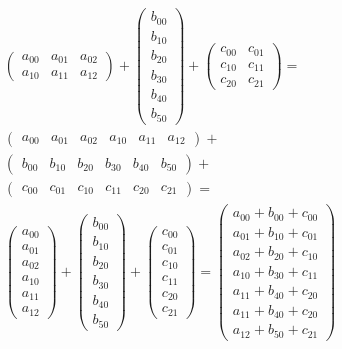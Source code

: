 \begin{multline}
    \begin{pmatrix} a_{00} & a_{01} & a_{02} \\ a_{10} & a_{11} & a_{12} \end{pmatrix} +
    \begin{pmatrix} b_{00} \\ b_{10} \\ b_{20} \\ b_{30} \\ b_{40} \\ b_{50} \end{pmatrix} +
    \begin{pmatrix} c_{00} & c_{01} \\ c_{10} & c_{11} \\ c_{20} & c_{21} \end{pmatrix} = \\
    \begin{pmatrix} a_{00} & a_{01} & a_{02} & a_{10} & a_{11} & a_{12} \end{pmatrix} + \\
    \begin{pmatrix} b_{00} & b_{10} & b_{20} & b_{30} & b_{40} & b_{50} \end{pmatrix} + \\
    \begin{pmatrix} c_{00} & c_{01} & c_{10} & c_{11} & c_{20} & c_{21} \end{pmatrix} = \\
    \begin{pmatrix} a_{00} \\ a_{01} \\ a_{02} \\ a_{10} \\ a_{11} \\ a_{12} \end{pmatrix} +
    \begin{pmatrix} b_{00} \\ b_{10} \\ b_{20} \\ b_{30} \\ b_{40} \\ b_{50} \end{pmatrix} +
    \begin{pmatrix} c_{00} \\ c_{01} \\ c_{10} \\ c_{11} \\ c_{20} \\ c_{21} \end{pmatrix} =
    \begin{pmatrix} a_{00} + b_{00} + c_{00} \\ a_{01} + b_{10} + c_{01} \\ a_{02} + b_{20} + c_{10} \\ a_{10} + b_{30} + c_{11} \\ a_{11} + b_{40} + c_{20} \\ a_{11} + b_{40} + c_{20} \\ a_{12} + b_{50} + c_{21} \end{pmatrix}
\end{multline}

